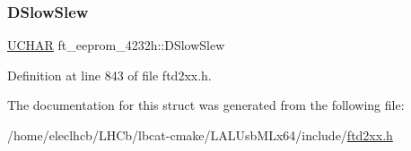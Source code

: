 \subsubsection{\texorpdfstring{D\+Slow\+Slew}{DSlowSlew}}
{\footnotesize\ttfamily \hyperlink{CatCaloProto40MHz_2inc_2WinTypes_8h_a4f4bb67531a9bf6f0b9c6ad76aeba587}{U\+C\+H\+AR} ft\+\_\+eeprom\+\_\+4232h\+::\+D\+Slow\+Slew}



Definition at line 843 of file ftd2xx.\+h.



The documentation for this struct was generated from the following file\+:\begin{DoxyCompactItemize}
\item 
/home/eleclhcb/\+L\+H\+Cb/lbcat-\/cmake/\+L\+A\+L\+Usb\+M\+Lx64/include/\hyperlink{LALUsbMLx64_2include_2ftd2xx_8h}{ftd2xx.\+h}\end{DoxyCompactItemize}
